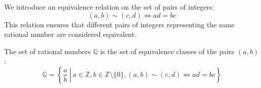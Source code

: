 
\begin{note}
	We introduce an equivalence relation on the set of pairs of integers:
	\[
	(a, b) \sim (c, d) \iff ad = bc
	\]
	This relation ensures that different pairs of integers representing the same rational number are considered equivalent.
		
	The set of rational numbers \(\mathbb{Q}\) is the set of equivalence classes of the pairs \((a, b)\):
	\[
	\mathbb{Q} = \left\{ \left. \frac{a}{b} \ \right| \ a \in \mathbb{Z}, b \in \mathbb{Z} \setminus \{0\}, (a, b) \sim (c, d) \iff ad = bc \right\}
	\]
\end{note}

